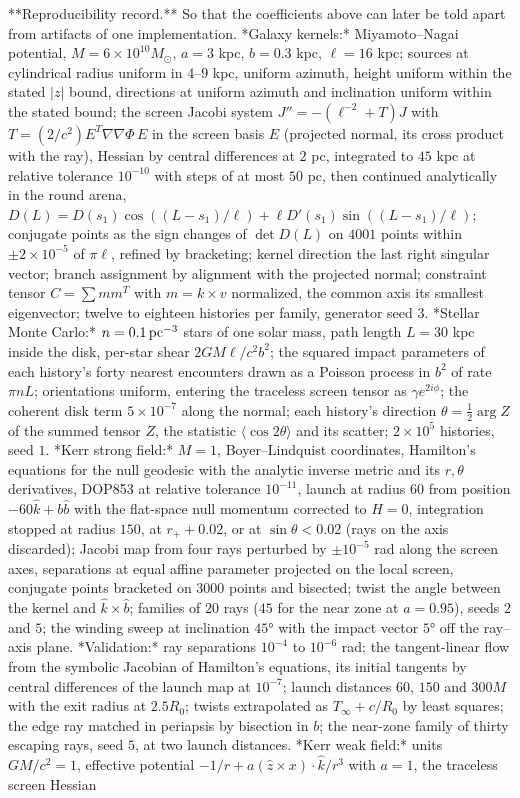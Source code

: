 **Reproducibility record.** So that the coefficients above can later be told apart from artifacts of one implementation. *Galaxy kernels:* Miyamoto–Nagai potential, $M = 6\times10^{10}M_\odot$, $a = 3$ kpc, $b = 0.3$ kpc, $\ell = 16$ kpc; sources at cylindrical radius uniform in $4$–$9$ kpc, uniform azimuth, height uniform within the stated $|z|$ bound, directions at uniform azimuth and inclination uniform within the stated bound; the screen Jacobi system $J'' = -(\ell^{-2}+T)J$ with $T = (2/c^2)E^T\nabla\nabla\Phi\,E$ in the screen basis $E$ (projected normal, its cross product with the ray), Hessian by central differences at $2$ pc, integrated to $45$ kpc at relative tolerance $10^{-10}$ with steps of at most $50$ pc, then continued analytically in the round arena, $D(L) = D(s_1)\cos((L-s_1)/\ell)+\ell D'(s_1)\sin((L-s_1)/\ell)$; conjugate points as the sign changes of $\det D(L)$ on $4001$ points within $\pm2\times10^{-5}$ of $\pi\ell$, refined by bracketing; kernel direction the last right singular vector; branch assignment by alignment with the projected normal; constraint tensor $C = \sum m m^T$ with $m = k\times v$ normalized, the common axis its smallest eigenvector; twelve to eighteen histories per family, generator seed $3$. *Stellar Monte Carlo:* $n = 0.1\,{\rm pc}^{-3}$ stars of one solar mass, path length $L = 30$ kpc inside the disk, per-star shear $2GM\ell/c^2b^2$; the squared impact parameters of each history's forty nearest encounters drawn as a Poisson process in $b^2$ of rate $\pi nL$; orientations uniform, entering the traceless screen tensor as $\gamma e^{2i\phi}$; the coherent disk term $5\times10^{-7}$ along the normal; each history's direction $\theta = \tfrac12\arg Z$ of the summed tensor $Z$, the statistic $\langle\cos2\theta\rangle$ and its scatter; $2\times10^5$ histories, seed $1$. *Kerr strong field:* $M = 1$, Boyer–Lindquist coordinates, Hamilton's equations for the null geodesic with the analytic inverse metric and its $r,\theta$ derivatives, DOP853 at relative tolerance $10^{-11}$, launch at radius $60$ from position $-60\hat k+b\hat b$ with the flat-space null momentum corrected to $H = 0$, integration stopped at radius $150$, at $r_++0.02$, or at $\sin\theta<0.02$ (rays on the axis discarded); Jacobi map from four rays perturbed by $\pm10^{-5}$ rad along the screen axes, separations at equal affine parameter projected on the local screen, conjugate points bracketed on $3000$ points and bisected; twist the angle between the kernel and $\hat k\times\hat b$; families of $20$ rays ($45$ for the near zone at $a = 0.95$), seeds $2$ and $5$; the winding sweep at inclination $45°$ with the impact vector $5°$ off the ray–axis plane. *Validation:* ray separations $10^{-4}$ to $10^{-6}$ rad; the tangent-linear flow from the symbolic Jacobian of Hamilton's equations, its initial tangents by central differences of the launch map at $10^{-7}$; launch distances $60$, $150$ and $300M$ with the exit radius at $2.5R_0$; twists extrapolated as $T_\infty+c/R_0$ by least squares; the edge ray matched in periapsis by bisection in $b$; the near-zone family of thirty escaping rays, seed $5$, at two launch distances. *Kerr weak field:* units $GM/c^2 = 1$, effective potential $-1/r+a(\hat z\times x)\cdot\hat k/r^3$ with $a = 1$, the traceless screen Hessian 
